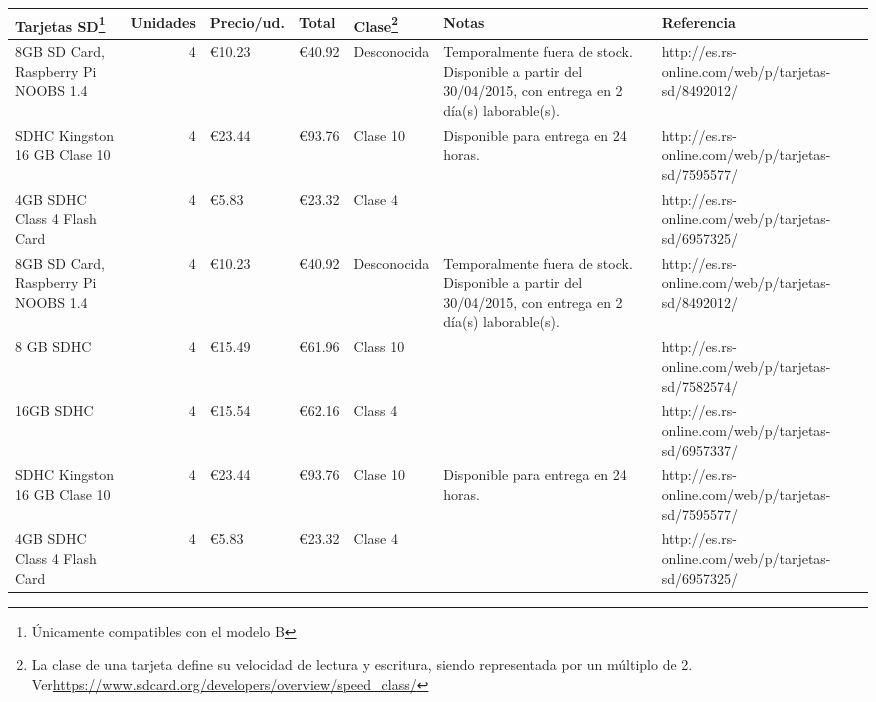 \begin{landscape}
\begin{table}
\begin{tabular}{|l|r|l|l|l|p{3.5cm}|p{4.5cm}|}
\hline
Tarjetas SD\footnote{Únicamente compatibles con el modelo B}&Unidades&Precio/ud.&Total&Clase\footnote{La clase de una tarjeta define su velocidad de lectura y escritura, siendo representada por un múltiplo de 2. Ver\href{https://www.sdcard.org/developers/overview/speed_class/}{https://www.sdcard.org/developers/overview/speed\_class/}}&Notas&Referencia\\
\hline
8GB SD Card, Raspberry Pi NOOBS 1.4&4&€10.23&€40.92&Desconocida&Temporalmente fuera de stock. Disponible a partir del 30/04/2015, con entrega en 2 día(s) laborable(s).&http://es.rs-online.com/web/p/tarjetas-sd/8492012/\\
\hline
SDHC Kingston 16 GB Clase 10&4&€23.44&€93.76&Clase 10&Disponible para entrega en 24 horas.&http://es.rs-online.com/web/p/tarjetas-sd/7595577/\\
\hline
4GB SDHC Class 4 Flash Card&4&€5.83&€23.32&Clase 4&&http://es.rs-online.com/web/p/tarjetas-sd/6957325/\\
\hline
8GB SD Card, Raspberry Pi NOOBS 1.4&4&€10.23&€40.92&Desconocida&Temporalmente fuera de stock. Disponible a partir del 30/04/2015, con entrega en 2 día(s) laborable(s).&http://es.rs-online.com/web/p/tarjetas-sd/8492012/\\
\hline
8 GB SDHC&4&€15.49&€61.96&Class 10&&http://es.rs-online.com/web/p/tarjetas-sd/7582574/\\
\hline
16GB SDHC&4&€15.54&€62.16&Class 4&&http://es.rs-online.com/web/p/tarjetas-sd/6957337/\\
\hline
SDHC Kingston 16 GB Clase 10&4&€23.44&€93.76&Clase 10&Disponible para entrega en 24 horas.&http://es.rs-online.com/web/p/tarjetas-sd/7595577/\\
\hline
4GB SDHC Class 4 Flash Card&4&€5.83&€23.32&Clase 4&&http://es.rs-online.com/web/p/tarjetas-sd/6957325/\\
\hline
\end{tabular}
\newline
\end{table}
\end{landscape}

